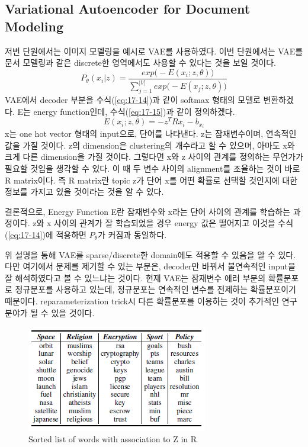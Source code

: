 \documentclass[draft=false]{oblivoir}
\begin{document}
\subsection{Variational Autoencoder for Document Modeling}
저번 단원에서는 이미지 모델링을 예시로 VAE를 사용하였다. 이번 단원에서는 VAE를 문서 모델링과 같은 discrete한 영역에서도 사용할 수 있다는 것을 보일 것이다.
\begin{equation}
	P_\theta (x_i|z) = \frac{exp\Big(-E(x_i;z,\theta) \Big)}{\sum_{j=1}^{|V|}exp\Big(-E(x_j;z,\theta) \Big)}
	\label{eq:17-14}
\end{equation}
VAE에서 decoder 부분을 수식(\ref{eq:17-14})과 같이 softmax 형태의 모델로 변환하겠다. E는 energy function인데, 수식(\ref{eq:17-15})과 같이 정의하겠다.
\begin{equation}
	E(x_i;z,\theta) = -z^TRx_i-b_{x_i}
	\label{eq:17-15}
\end{equation}
x는 one hot vector 형태의 input으로, 단어를 나타낸다. z는 잠재변수이며, 연속적인 값을 가질 것이다. z의 dimension은 clustering의 개수라고 할 수 있으며, 아마도 x와 크게 다른 dimension을 가질 것이다. 그렇다면 x와 z 사이의 관계를 정의하는 무언가가 필요할 것임을 생각할 수 있다. 이 때 두 변수 사이의 alignment를 조율하는 것이 바로 R matrix이다. 즉 R matrix란 topic z가 단어 x를 어떤 확률로 선택할 것인지에 대한 정보를 가지고 있을 것이라는 것을 알 수 있다.

결론적으로, Energy Function E란 잠재변수와 x라는 단어 사이의 관계를 학습하는 과정이다. z와 x 사이의 관계가 잘 학습되었을 경우 energy 값은 떨어지고 이것을 수식 (\ref{eq:17-14})에 적용하면 $P_\theta$가 커짐과 동일하다.       

위 설명을 통해 VAE를 sparse/discrete한 domain에도 적용할 수 있음을 알 수 있다. 다만 여기에서 문제를 제기할 수 있는 부분은, decoder만 바꿔서 불연속적인 input을 잘 해석하였다고 볼 수 있느냐는 것이다. 현재 VAE는 잠재변수 에러 부분의 확률분포로 정규분포를 사용하고 있는데, 정규분포는 연속적인 변수를 전제하는 확률분포이기 때문이다. reparameterization trick시 다른 확률분포를 이용하는 것이 추가적인 연구분야가 될 수 있을 것이다.

\begin{figure}[ht] \centering
  \includegraphics[scale=1.5]{fig12.png}
  \caption{Sorted list of words with association to Z in R}
  \label{fig:17-12}
\end{figure}
\end{document}
